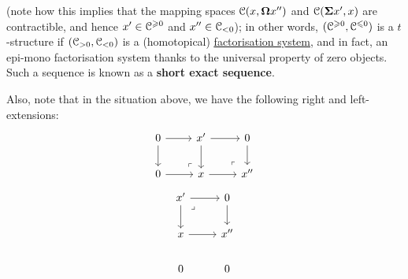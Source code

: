 \begin{definition}[t-structures]
\begin{enumerate}
\begin{enumerate}
$$                                $$
                            (note how this implies that the mapping spaces $\mathcal{C}(x, \mathbf{\Omega} x'')$ and $\mathcal{C}(\mathbf{\Sigma} x', x)$ are contractible, and hence $x' \in \mathcal{C}^{\geqslant 0}$ and $x'' \in \mathcal{C}_{< 0}$); in other words, $(\mathcal{C}^{\geqslant 0}, \mathcal{C}^{\leqslant 0})$ is a $t$-structure if $(\mathcal{C}_{> 0}, \mathcal{C}_{< 0})$ is a (homotopical) \href{https://ncatlab.org/joyalscatlab/published/Factorisation+systems}{\underline{factorisation system}}, and in fact, an epi-mono factorisation system thanks to the universal property of zero objects. Such a sequence is known as a \textbf{short exact sequence}. 
                            
                            Also, note that in the situation above, we have the following right and left-extensions:
                                $$
                                    \begin{tikzcd}
                                        0 & {x'} & 0 \\
                                        0 & x & {x''}
                                        \arrow[from=1-3, to=2-3]
                                        \arrow[from=2-2, to=2-3]
                                        \arrow[from=1-2, to=2-2]
                                        \arrow[from=1-2, to=1-3]
                                        \arrow["\lrcorner"{anchor=center, pos=0.125, rotate=180}, draw=none, from=2-3, to=1-2]
                                        \arrow[from=1-1, to=2-1]
                                        \arrow[from=2-1, to=2-2]
                                        \arrow[from=1-1, to=1-2]
                                        \arrow["\lrcorner"{anchor=center, pos=0.125, rotate=180}, draw=none, from=2-2, to=1-1]
                                    \end{tikzcd}
                                $$
                                $$
                                    \begin{tikzcd}
                                        {x'} & 0 \\
                                        x & {x''} \\
                                        0 & 0
                                        \arrow[from=1-2, to=2-2]
                                        \arrow[from=2-1, to=2-2]
                                        \arrow[from=1-1, to=2-1]
                                        \arrow[from=1-1, to=1-2]
                                        \arrow["\lrcorner"{anchor=center, pos=0.125}, draw=none, from=1-1, to=2-2]

\end{tikzcd}$$
\end{enumerate}
\end{enumerate}
\end{definition}

